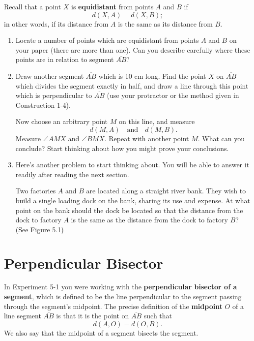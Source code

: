 \documentclass[12pt]{book} %
\begin{document}
Recall that a point $X$ is \textbf{equidistant} from points $A$ and $B$ if
\[
d(X,A)=d(X,B);
\]
in other words, if its distance from $A$ is the same as its distance from $B$.

\begin{enumerate}
\item Locate a number of points which are equidistant from points $A$ and $B$ on your paper (there are more than one). Can you describe carefully where these points are in relation to segment $\overline{AB}$?

\item Draw another segment $\overline{AB}$ which is 10 cm long. Find the point $X$ on $\overline{AB}$ which divides the segment exactly in half, and draw a line through this point which is perpendicular to $\overline{AB}$ (use your protractor or the method given in Construction 1-4).

Now choose an arbitrary point $M$ on this line, and measure
\[
d(M,A)\quad \text{and} \quad d(M,B).
\]
Measure $\angle AMX$ and $\angle BMX$. Repeat with another point $M$. What can you conclude? Start thinking about how you might prove your conclusions.

\item Here's another problem to start thinking about. You will be able to answer it readily after reading the next section.

Two factories $A$ and $B$ are located along a straight river bank. They wish to build a single loading dock on the bank, sharing its use and expense. At what point on the bank should the dock be located so that the distance from the dock to factory $A$ is the same as the distance from the dock to factory $B$? (See Figure 5.1)

\end{enumerate}

\section{Perpendicular Bisector}

In Experiment 5-1 you were working with the \textbf{perpendicular bisector of a segment}, which is defined to be the line perpendicular to the segment passing through the segment's midpoint. The precise definition of the \textbf{midpoint} $O$ of a line segment $\overline{AB}$ is that it is the point on $\overline{AB}$ such that
\[
d(A,O)=d(O,B).
\]
We also say that the midpoint of a segment bisects the segment.
\end{document}
